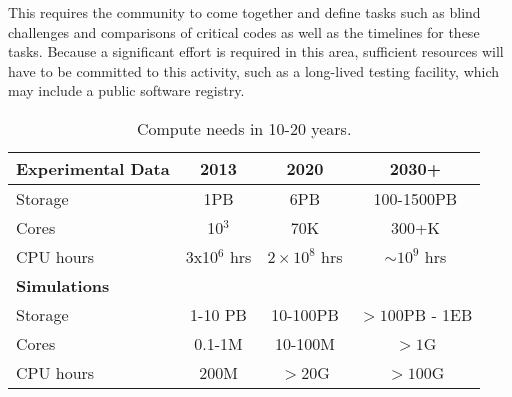 This requires the community to come together and define tasks such as
blind challenges and comparisons of critical codes as well as the
timelines for these tasks. Because a significant effort is required in
this area, sufficient resources will have to be committed to this
activity, such as a long-lived testing facility, which may include a
public software registry.

\medskip


\begin{center}
\begin{table}
\begin{tabular}{|l|c|c|c|} 
 \hline 
{\bf Experimental Data} & 2013 & 2020 & 2030+ \\
\hline
Storage & 1PB & 6PB & 100-1500PB \\
Cores & 10$^3$ & 70K & 300+K \\
CPU hours & 3x10$^6$ hrs & $2\times 10^8$ hrs & $\sim 10^9$ hrs \\
{\bf Simulations} &&& \\
Storage & 1-10 PB & 10-100PB & $> 100$PB - 1EB\\
Cores & 0.1-1M & 10-100M &$> 1$G\\
CPU hours & 200M & $>$20G & $> 100$G
\label{tab:CompNeeds}
\end{tabular}
\caption{Compute needs in 10-20 years.}
\end{table}
\end{center}

